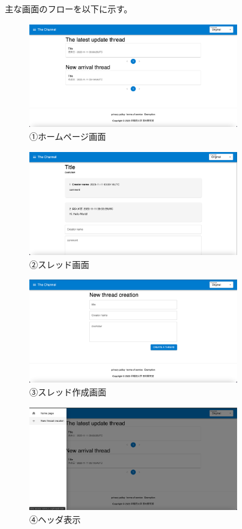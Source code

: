 \documentclass[b5paper,12pt]{jsreport}
\begin{document}
主な画面のフローを以下に示す。

\begin{figure}[htbp]
	\centering
	\includegraphics[width=90mm,height=45mm]{img/home.png}

	\caption*{①ホームページ画面}
\end{figure}
\begin{figure}[htbp]
	\centering
	\includegraphics[width=90mm,height=45mm]{img/thread.png}

	\caption*{②スレッド画面}
\end{figure}

\begin{figure}[htbp]
	\centering
	\includegraphics[width=90mm,height=45mm]{img/thread_create.png}

	\caption*{③スレッド作成画面}
\end{figure}

\begin{figure}[htbp]
	\centering
	\includegraphics[width=90mm,height=45mm]{img/side_menu.png}

	\caption*{④ヘッダ表示}
\end{figure}
\end{document}
